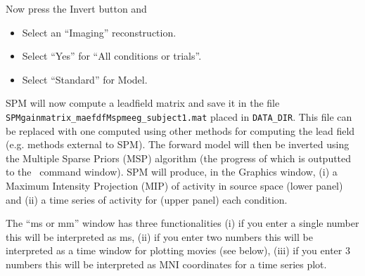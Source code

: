 Now press the Invert button and
\begin{itemize}
\item{Select an ``Imaging'' reconstruction.}
\item{Select ``Yes'' for ``All conditions or trials''.}
\item{Select ``Standard'' for Model.}
\end{itemize}
SPM will now compute a leadfield matrix and save it in the file \texttt{SPMgainmatrix\_maefdfMspmeeg\_subject1.mat} placed in \texttt{DATA\_DIR}. This file can be replaced with one computed using other methods for computing the lead field (e.g. methods external to SPM). The forward model will then be inverted using the Multiple Sparse Priors (MSP) algorithm (the progress of which is outputted to the \matlab\ command window). SPM will produce, in the Graphics window, (i) a Maximum Intensity Projection (MIP) of activity in source space (lower panel) and (ii) a time series of activity for (upper panel) each condition.

The ``ms or mm'' window has three functionalities (i) if you enter a single number this will be interpreted as ms, (ii) if you enter two numbers this will be interpreted as a time window for plotting movies (see below), (iii) if you enter 3 numbers this will be interpreted as MNI coordinates for a time series plot.

